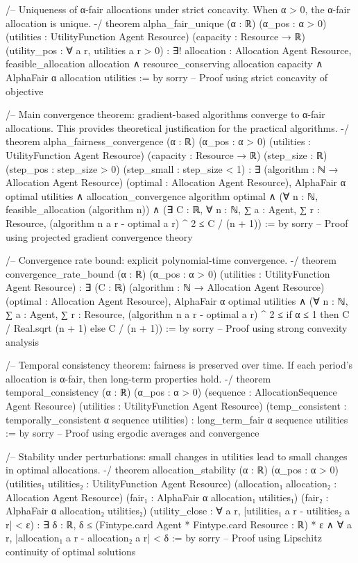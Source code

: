 /--
Uniqueness of α-fair allocations under strict concavity.
When α > 0, the α-fair allocation is unique.
-/
theorem alpha_fair_unique (α : ℝ) (α_pos : α > 0)
    (utilities : UtilityFunction Agent Resource)
    (capacity : Resource → ℝ)
    (utility_pos : ∀ a r, utilities a r > 0) :
    ∃! allocation : Allocation Agent Resource,
      feasible_allocation allocation ∧
      resource_conserving allocation capacity ∧
      AlphaFair α allocation utilities := by
  sorry -- Proof using strict concavity of objective

/--
Main convergence theorem: gradient-based algorithms converge to α-fair allocations.
This provides theoretical justification for the practical algorithms.
-/
theorem alpha_fairness_convergence (α : ℝ) (α_pos : α > 0)
    (utilities : UtilityFunction Agent Resource)
    (capacity : Resource → ℝ)
    (step_size : ℝ) (step_pos : step_size > 0) (step_small : step_size < 1) :
    ∃ (algorithm : ℕ → Allocation Agent Resource) 
      (optimal : Allocation Agent Resource),
      AlphaFair α optimal utilities ∧
      allocation_convergence algorithm optimal ∧
      (∀ n : ℕ, feasible_allocation (algorithm n)) ∧
      (∃ C : ℝ, ∀ n : ℕ, 
        ∑ a : Agent, ∑ r : Resource, (algorithm n a r - optimal a r) ^ 2 ≤ C / (n + 1)) := by
  sorry -- Proof using projected gradient convergence theory

/--
Convergence rate bound: explicit polynomial-time convergence.
-/
theorem convergence_rate_bound (α : ℝ) (α_pos : α > 0)
    (utilities : UtilityFunction Agent Resource) :
    ∃ (C : ℝ) (algorithm : ℕ → Allocation Agent Resource) 
      (optimal : Allocation Agent Resource),
      AlphaFair α optimal utilities ∧
      (∀ n : ℕ, 
        ∑ a : Agent, ∑ r : Resource, (algorithm n a r - optimal a r) ^ 2 ≤ 
        if α ≤ 1 then C / Real.sqrt (n + 1) else C / (n + 1)) := by
  sorry -- Proof using strong convexity analysis

/--
Temporal consistency theorem: fairness is preserved over time.
If each period's allocation is α-fair, then long-term properties hold.
-/
theorem temporal_consistency (α : ℝ) (α_pos : α > 0)
    (sequence : AllocationSequence Agent Resource)
    (utilities : UtilityFunction Agent Resource)
    (temp_consistent : temporally_consistent α sequence utilities) :
    long_term_fair α sequence utilities := by
  sorry -- Proof using ergodic averages and convergence

/--
Stability under perturbations: small changes in utilities lead to small changes
in optimal allocations.
-/
theorem allocation_stability (α : ℝ) (α_pos : α > 0)
    (utilities₁ utilities₂ : UtilityFunction Agent Resource)
    (allocation₁ allocation₂ : Allocation Agent Resource)
    (fair₁ : AlphaFair α allocation₁ utilities₁)
    (fair₂ : AlphaFair α allocation₂ utilities₂)
    (utility_close : ∀ a r, |utilities₁ a r - utilities₂ a r| < ε) :
    ∃ δ : ℝ, δ ≤ (Fintype.card Agent * Fintype.card Resource : ℝ) * ε ∧
    ∀ a r, |allocation₁ a r - allocation₂ a r| < δ := by
  sorry -- Proof using Lipschitz continuity of optimal solutions

